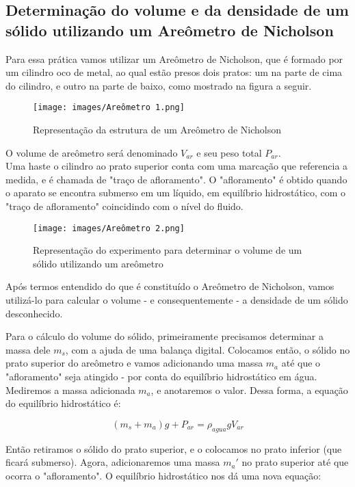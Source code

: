\subsection{Determinação do volume e da densidade de um sólido
utilizando um Areômetro de Nicholson}

Para essa prática vamos utilizar um Areômetro de Nicholson, que é formado por um cilindro oco de metal, ao qual estão presos dois pratos: um na parte de cima do cilindro, e outro na parte de baixo, como mostrado na figura a seguir.\\

\begin{figure}[H]
    \centering
    \texttt{[image: images/Areômetro 1.png]}
    \caption{Representação da estrutura de um Areômetro de Nicholson}
\end{figure}

O volume de areômetro será denominado $V_{ar}$ e seu peso total $P_{ar}$.\\

Uma haste o cilindro ao prato superior conta com uma marcação que referencia a medida, e é chamada de "traço de afloramento". O "afloramento" é obtido quando o aparato se encontra submerso em um líquido, em equilíbrio hidrostático, com o "traço de afloramento" coincidindo com o nível do fluido.\\

\begin{figure}[H]
    \centering
    \texttt{[image: images/Areômetro 2.png]}
    \caption{Representação do experimento para determinar o volume de um sólido utilizando um areômetro}
\end{figure}

Após termos entendido do que é constituído o Areômetro de Nicholson, vamos utilizá-lo para calcular o volume - e consequentemente - a densidade de um sólido desconhecido.

Para o cálculo do volume do sólido, primeiramente precisamos determinar a massa dele $m_s$, com a ajuda de uma balança digital. Colocamos então, o sólido no prato superior do areômetro e vamos adicionando uma massa $m_a$ até que o "afloramento" seja atingido - por conta do equilíbrio hidrostático em água. Mediremos a massa adicionada $m_a$, e anotaremos o valor. 
Dessa forma, a equação do equilíbrio hidrostático é:

\[ (m_s + m_a)g + P_{ar} = \rho _{agua} g V_{ar} \]

Então retiramos o sólido do prato superior, e o colocamos no prato inferior (que ficará submerso). Agora, adicionaremos uma massa $m_a'$ no prato superior até que ocorra o "afloramento". O equilíbrio hidrostático nos dá uma nova equação:

